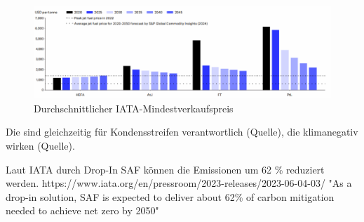 \begin{figure}[h]
	\centering
	\includegraphics[width=0.4\linewidth]{Bilder/Preise SAF.png}
	\caption[Durchschnittlicher IATA-Mindestverkaufspreis (MSP) der wichtigsten SAF-Pfade über den Zeitraum 2020 bis 2050]{Durchschnittlicher IATA-Mindestverkaufspreis \cite{icao_saf_conversion_2024}}
	\label{fuelcell}
\end{figure}



Die sind gleichzeitig für Kondensstreifen verantwortlich (Quelle), die klimanegativ wirken (Quelle). 


Laut IATA durch Drop-In SAF können die Emissionen um 62 \% reduziert werden. https://www.iata.org/en/pressroom/2023-releases/2023-06-04-03/
"As a drop-in solution, SAF is expected to deliver about 62\% of carbon mitigation needed to achieve net zero by 2050"

